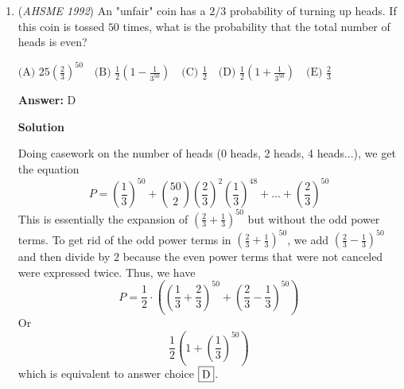 \begin{enumerate}
 So $\left(z-\frac{1}{2}\right)^2 = \frac{29}{4}(\cos \theta + i \sin \theta)$, and thus $z = \frac{1}{2} \pm \frac{\sqrt{29}}{2}\left(\cos\frac{\theta}{2} + i \sin\frac{\theta}{2}\right)$.

 Since $\cos \theta > 0$ and $\sin \theta < 0$, $\frac{3\pi}{2} \leq \theta \leq 2\pi$.  Thus $\frac{3\pi}{4} \leq \frac{\theta}{2} \leq \pi$, so $\cos \frac{\theta}{2} < 0$ and $\sin \frac{\theta}{2} > 0$. 

 Therefore, $\cos \frac{\theta}{2} = -\sqrt{\frac{1+\cos\theta}{2}} = -\frac{5}{\sqrt{29}}$ and $\sin \frac{\theta}{2} = \sqrt{\frac{1-\cos\theta}{2}} = \frac{2}{\sqrt{29}}$.

 So $z = \frac{1}{2} \pm \frac{\sqrt{29}}{2}\left(-\frac{5}{\sqrt{29}} + \frac{2}{\sqrt{29}}i\right) = \frac{1}{2} \pm \left(-\frac{5}{2} + i\right)$.  Therefore, the two solutions are $z = 3 - i$ and $z = -2 + i$, and the product of their real parts is $\boxed{\textbf{(B)}\ -6}$.

 


	\item (\textit{AHSME 1992}) An "unfair" coin has a $2/3$ probability of turning up heads. If this coin is tossed $50$ times, what is the probability that the total number of heads is even?


 $\text{(A) } 25\left(\frac{2}{3}\right)^{50}\quad \text{(B) } \frac{1}{2}\left(1-\frac{1}{3^{50}}\right)\quad \text{(C) } \frac{1}{2}\quad \text{(D) } \frac{1}{2}\left(1+\frac{1}{3^{50}}\right)\quad \text{(E) } \frac{2}{3}$

 \textbf{Answer: }D



\textbf{Solution}

Doing casework on the number of heads (0 heads, 2 heads, 4 heads...), we get the equation 
 \[P=\left(\frac{1}{3} \right)^{50}+\binom{50}{2}\left(\frac{2}{3} \right)^{2}\left(\frac{1}{3} \right)^{48}+\dots+\left(\frac{2}{3} \right)^{50}\] This is essentially the expansion of $\left(\frac{2}{3}+\frac{1}{3} \right)^{50}$ but without the odd power terms. To get rid of the odd power terms in $\left(\frac{2}{3}+\frac{1}{3} \right)^{50}$, we add $\left(\frac{2}{3}-\frac{1}{3} \right)^{50}$ and then divide by $2$ because the even power terms that were not canceled were expressed twice. Thus, we have 
 \[P=\frac{1}{2}\cdot\left(\left(\frac{1}{3}+\frac{2}{3} \right)^{50}+\left(\frac{2}{3}-\frac{1}{3} \right)^{50} \right)\] Or 
 \[\frac{1}{2}\left(1+\left(\frac{1}{3} \right)^{50} \right)\] which is equivalent to answer choice $\fbox{D}$.


\end{enumerate}
